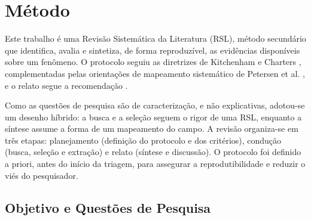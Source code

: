 %
%
%

\section{Método}
\label{sec:metodo}

Este trabalho é uma Revisão Sistemática da Literatura (RSL), método secundário que identifica, avalia e sintetiza, de forma reproduzível, as evidências disponíveis sobre um fenômeno. O protocolo seguiu as diretrizes de Kitchenham e Charters \citeyearpar{kitchenham2007}, complementadas pelas orientações de mapeamento sistemático de Petersen et al. \citeyearpar{petersen2015}, e o relato segue a recomendação  \citep{page2021}.

Como as questões de pesquisa são de caracterização, e não explicativas, adotou-se um desenho híbrido: a busca e a seleção seguem o rigor de uma RSL, enquanto a síntese assume a forma de um mapeamento do campo. A revisão organiza-se em três etapas: planejamento (definição do protocolo e dos critérios), condução (busca, seleção e extração) e relato (síntese e discussão). O protocolo foi definido a priori, antes do início da triagem, para assegurar a reprodutibilidade e reduzir o viés do pesquisador.

\subsection{Objetivo e Questões de Pesquisa}
\label{subsec:rqs}


